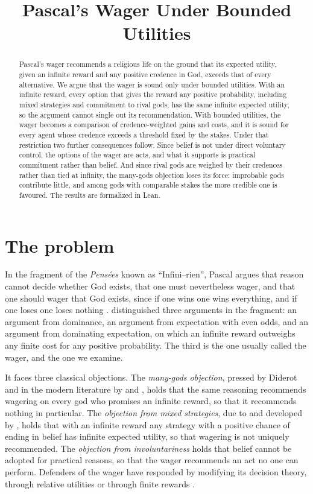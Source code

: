 \documentclass{situationist-preprint}
\title{Pascal's Wager Under Bounded Utilities}
\begin{document}
\maketitle

\begin{abstract}
Pascal's wager recommends a religious life on the ground that its expected utility, given an infinite reward and any positive credence in God, exceeds that of every alternative. We argue that the wager is sound only under bounded utilities. With an infinite reward, every option that gives the reward any positive probability, including mixed strategies and commitment to rival gods, has the same infinite expected utility, so the argument cannot single out its recommendation. With bounded utilities, the wager becomes a comparison of credence-weighted gains and costs, and it is sound for every agent whose credence exceeds a threshold fixed by the stakes. Under that restriction two further consequences follow. Since belief is not under direct voluntary control, the options of the wager are acts, and what it supports is practical commitment rather than belief. And since rival gods are weighed by their credences rather than tied at infinity, the many-gods objection loses its force: improbable gods contribute little, and among gods with comparable stakes the more credible one is favoured. The results are formalized in Lean.
\end{abstract}

\section{The problem}

In the fragment of the \emph{Pens\'ees} known as \enquote{Infini--rien}, Pascal argues that reason cannot decide whether God exists, that one must nevertheless wager, and that one should wager that God exists, since if one wins one wins everything, and if one loses one loses nothing \citep{Pascal1670}. \citet{Hacking1972} distinguished three arguments in the fragment: an argument from dominance, an argument from expectation with even odds, and an argument from dominating expectation, on which an infinite reward outweighs any finite cost for any positive probability. The third is the one usually called the wager, and the one we examine.

It faces three classical objections. The \emph{many-gods objection}, pressed by Diderot and in the modern literature by \citet{Cargile1966} and \citet{Mackie1982}, holds that the same reasoning recommends wagering on every god who promises an infinite reward, so that it recommends nothing in particular. The \emph{objection from mixed strategies}, due to \citet{Duff1986} and developed by \citet{Hajek2003}, holds that with an infinite reward any strategy with a positive chance of ending in belief has infinite expected utility, so that wagering is not uniquely recommended. The \emph{objection from involuntariness} holds that belief cannot be adopted for practical reasons, so that the wager recommends an act no one can perform. Defenders of the wager have responded by modifying its decision theory, through relative utilities \citep{Bartha2007} or through finite rewards \citep{McClennen1994,Jordan2006}.
\end{document}
